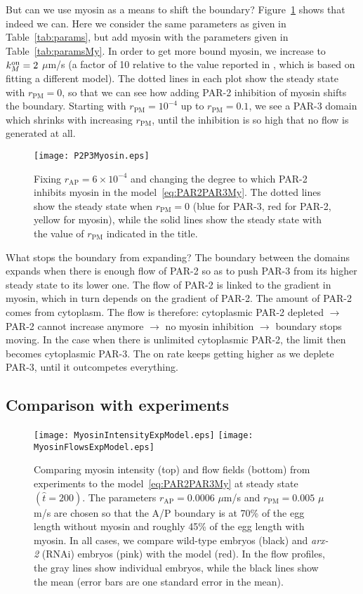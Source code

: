 \documentclass[11pt]{article}
\newcommand{\6}[1]{#1_{\text{6}}}
\newcommand{\3}[1]{#1_{\text{3}}}
\begin{document}
But can we use myosin as a means to shift the boundary? Figure\ \ref{fig:P2P3My} shows that indeed we can. Here we consider the same parameters as given in Table\ \ref{tab:params}, but add myosin with the parameters given in Table\ \ref{tab:paramsMy}. In order to get more bound myosin, we increase to $k^\text{on}_M=2$ $\mu$m/s (a factor of 10 relative to the value reported in \cite{gross2019guiding}, which is based on fitting a different model). The dotted lines in each plot show the steady state with $r_\text{PM}=0$, so that we can see how adding PAR-2 inhibition of myosin shifts the boundary. Starting with $r_\text{PM}=10^{-4}$ up to $r_\text{PM}=0.1$, we see a PAR-3 domain which shrinks with increasing $r_\text{PM}$, until the inhibition is so high that no flow is generated at all. 

\begin{figure}
\centering
\texttt{[image: P2P3Myosin.eps]}
\caption{\label{fig:P2P3My} Fixing $r_\text{AP}=6 \times 10^{-4}$ and changing the degree to which PAR-2 inhibits myosin in the model\ \eqref{eq:PAR2PAR3My}. The dotted lines show the steady state when $r_\text{PM}=0$ (blue for PAR-3, red for PAR-2, yellow for myosin), while the solid lines show the steady state with the value of $r_\text{PM}$ indicated in the title.}
\end{figure}

What stops the boundary from expanding? 
The boundary between the domains expands when there is enough flow of PAR-2 so as to push PAR-3 from its higher steady state to its lower one. The flow of PAR-2 is linked to the gradient in myosin, which in turn depends on the gradient of PAR-2. The amount of PAR-2 comes from cytoplasm. The flow is therefore: cytoplasmic PAR-2 depleted $\rightarrow$ PAR-2 cannot increase anymore $\rightarrow$ no myosin inhibition $\rightarrow$ boundary stops moving. In the case when there is unlimited cytoplasmic PAR-2, the limit then becomes cytoplasmic PAR-3. The on rate keeps getting higher as we deplete PAR-3, until it outcompetes everything.

\subsection{Comparison with experiments}
\begin{figure}
\centering
\texttt{[image: MyosinIntensityExpModel.eps]}
\texttt{[image: MyosinFlowsExpModel.eps]}
\caption{\label{fig:ModelExp} Comparing myosin intensity (top) and flow fields (bottom) from experiments to the model\ \eqref{eq:PAR2PAR3My} at steady state $\left(\hat t = 200\right)$. The parameters $r_\text{AP}=0.0006$ $\mu$m/s and $r_\text{PM}=0.005$ $\mu$m/s are chosen so that the A/P boundary is at 70\% of the egg length without myosin and roughly 45\% of the egg length with myosin. In all cases, we compare wild-type embryos (black) and \emph{arx-2} (RNAi) embryos (pink) with the model (red). In the flow profiles, the gray lines show individual embryos, while the black lines show the mean (error bars are one standard error in the mean).  }
\end{figure}
\end{document}

